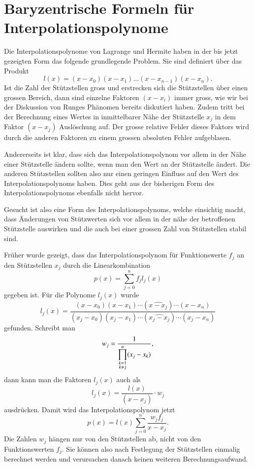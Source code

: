 %
%
%
\section{Baryzentrische Formeln für Interpolationspolynome
\label{buch:section:baryzentrisch}}
Die Interpolationspolynome von Lagrange und Hermite haben 
in der bis jetzt gezeigten Form das folgende grundlegende Problem.
Sie sind definiert über das Produkt
\[
l(x)
=
(x-x_0)(x-x_1)\dots (x-x_{n-1})(x-x_n).
\]
Ist die Zahl der Stützstellen gross und erstrecken sich die 
Stützstellen über einen grossen Bereich, dann sind einzelne Faktoren
$(x-x_i)$ immer gross, wie wir bei der Diskussion von Runges Phänomen
bereits diskutiert haben.
Zudem tritt bei der Berechnung eines Wertes in inmittelbarer 
Nähe der Stützstelle $x_j$ in dem Faktor $(x-x_j)$ Auslöschung auf.
Der grosse relative Fehler dieses Faktors wird durch die anderen Faktoren
zu einem grossen absoluten Fehler aufgeblasen.

Andererseits ist klar, dass sich das Interpolationspolynom vor allem
in der Nähe einer Stützstelle ändern sollte, wenn man den Wert an der
Stützstelle ändert.
Die anderen Stützstellen sollten also nur einen geringen Einfluss auf
den Wert des Interpolationspolynoms haben.
Dies geht aus der bisherigen Form des Interpolationspolynoms ebenfalls
nicht hervor.

Gesucht ist also eine Form des Interpolationspolynoms, welche einsichtig
macht, dass Änderungen von Stützwerten sich vor allem in der nähe der
betroffenen Stützstelle auswirken und die auch bei einer grossen Zahl
von Stützstellen stabil sind.

Früher wurde gezeigt, dass das Interpolationspolynom für Funktionswerte
$f_j$ an den Stützstellen $x_j$ durch die Linearkombination
\[
p(x) = \sum_{j=0}^n f_j l_j(x)
\]
gegeben ist.
Für die Polynome $l_j(x)$ wurde
\[
l_j(x)
=
\frac{
(x-x_0)(x-x_1)\cdots(\widehat{x-x_j}) \cdots (x-x_n)
}{
(x_j-x_0)(x_j-x_1)\cdots (\widehat{x_j-x_j})\cdots (x_j-x_n)
}
\]
gefunden.
Schreibt man
\[
w_j
=
\frac{1}{
\displaystyle\prod_{\scriptstyle k=1\atop \scriptstyle k\ne j}^n (x_j-x_k)
},
\]
dann kann man die Faktoren $l_j(x)$ auch als
\[
l_j(x)
=
\frac{l(x)}{(x-x_j)}\cdot w_j
\]
ausdrücken.
Damit wird das Interpolationspolynom jetzt
\begin{equation}
p(x)
=
l(x) \sum_{j=0}^n \frac{w_jf_j}{x-x_j}.
\label{buch:bary:px}
\end{equation}
Die Zahlen $w_j$ hängen nur von den Stützstellen ab, nicht von den
Funktionswerten $f_j$. 
Sie können also nach Festlegung der Stützstellen einmalig berechnet
werden und verursachen danach keinen weiteren Berechnungsaufwand.

